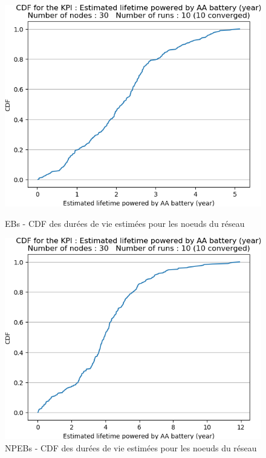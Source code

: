 \documentclass[]{report}
\begin{document}
\begin{figure}[!ht]
	\begin{minipage}{0.49\textwidth}
		\centering
		\includegraphics[width=\textwidth]{results/EB/lifetime_AA_years.cdf}
		\caption{EBs - CDF des durées de vie estimées pour les noeuds du réseau}
		\label{fig:EBlifetime}
	\end{minipage}\hfill
	\begin{minipage}{0.5\textwidth}
		\centering
		\includegraphics[width=\textwidth]{results/NPEB/lifetime_AA_years.cdf}
		\caption{NPEBs - CDF des durées de vie estimées pour les noeuds du réseau}
		\label{fig:NPEBlifetime}
	\end{minipage}	
\end{figure}
\end{document}
